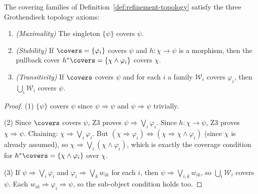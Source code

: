 \begin{proposition}
\label{prop:grothendieck-axioms}
The covering families of Definition~\ref{def:refinement-topology} satisfy
the three Grothendieck topology axioms:
\begin{enumerate}
\item \emph{(Maximality)} The singleton $\{\psi\}$ covers $\psi$.
\item \emph{(Stability)} If $\covers = \{\varphi_i\}$ covers $\psi$ and
  $h : \chi \to \psi$ is a morphism, then the pullback cover
  $h^*\covers = \{\chi \wedge \varphi_i\}$ covers $\chi$.
\item \emph{(Transitivity)} If $\covers$ covers $\psi$ and for each $i$ a
  family $\mathcal{W}_i$ covers $\varphi_i$, then $\bigcup_i \mathcal{W}_i$
  covers $\psi$.
\end{enumerate}
\end{proposition}

\begin{proof}
(1) $\{\psi\}$ covers $\psi$ since $\psi \Rightarrow \psi$ and
$\psi \Rightarrow \psi$ trivially.

(2) Since $\covers$ covers $\psi$, Z3 proves $\psi \Rightarrow
\bigvee_i \varphi_i$.  Since $h : \chi \to \psi$, Z3 proves $\chi
\Rightarrow \psi$.  Chaining: $\chi \Rightarrow \bigvee_i \varphi_i$.
But $(\chi \Rightarrow \varphi_i) \Leftrightarrow (\chi \Rightarrow
\chi \wedge \varphi_i)$ (since $\chi$ is already assumed), so
$\chi \Rightarrow \bigvee_i (\chi \wedge \varphi_i)$, which is exactly
the coverage condition for $h^*\covers = \{\chi \wedge \varphi_i\}$ over
$\chi$.

(3) If $\psi \Rightarrow \bigvee_i \varphi_i$ and $\varphi_i \Rightarrow
\bigvee_k w_{ik}$ for each $i$, then $\psi \Rightarrow \bigvee_{i,k}
w_{ik}$, so $\bigcup_i \mathcal{W}_i$ covers $\psi$.  Each
$w_{ik} \Rightarrow \varphi_i \Rightarrow \psi$, so the sub-object
condition holds too.
\end{proof}

